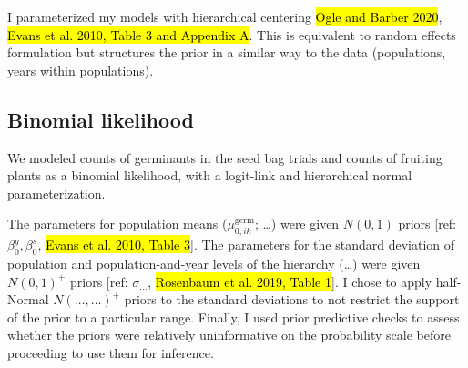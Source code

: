 \documentclass[12pt, oneside, titlepage]{article}   	%
\begin{document}
I parameterized my models with hierarchical centering \hl{Ogle and Barber 2020}, \hl{Evans et al. 2010, Table 3 and Appendix A}. This is equivalent to random effects formulation but structures the prior in a similar way to the data (populations, years within populations).


\subsection*{Binomial likelihood}

We modeled counts of germinants in the seed bag trials and counts of fruiting plants as a binomial likelihood, with a logit-link and hierarchical normal parameterization. 

The parameters for population means ($\mu_{0,ik}^\mathrm{germ}$; \dots) were given $N(0,1)$ priors [ref: $\beta_0^g, \beta_0^s$, \hl{Evans et al. 2010, Table 3}]. The parameters for the standard deviation of population and population-and-year levels of the hierarchy (\dots) were given $N(0,1)^+$ priors [ref: $\sigma_{\dots}$, \hl{Rosenbaum et al. 2019, Table 1}]. I chose to apply half-Normal $N(\dots,\dots)^+$ priors to the standard deviations to not restrict the support of the prior to a particular range. Finally, I used prior predictive checks to assess whether the priors were relatively uninformative on the probability scale before proceeding to use them for inference. 


\end{document}
